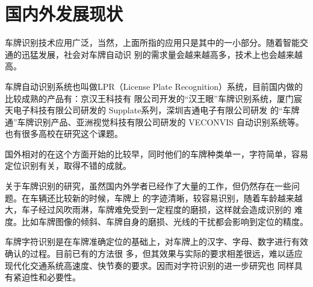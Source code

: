 \section{国内外发展现状}
车牌识别技术应用广泛，当然，上面所指的应用只是其中的一小部分。随着智能交通的迅猛发展，社会对车牌自动识
别的需求量会越来越高多，技术上也会越来越高。
\par
车牌自动识别系统也叫做LPR（License Plate Recognition）系统，目前国内做的比较成熟的产品有：京汉王科技有
限公司开发的“汉王眼”车牌识别系统，厦门宸天电子科技有限公司研发的 Supplate系列，深圳吉通电子有限公司研发
的“车牌通”车牌识别产品、亚洲视觉科技有限公司研发的 VECON­VIS 自动识别系统等。也有很多高校在研究这个课题。

国外相对的在这个方面开始的比较早，同时他们的车牌种类单一，字符简单，容易定位识别有关，取得不错的成就。
\par
关于车牌识别的研究，虽然国内外学者已经作了大量的工作，但仍然存在一些问题。在车辆还比较新的时候，车牌上
的字迹清晰，较容易识别，随着车龄越来越大，车子经过风吹雨淋，车牌难免受到一定程度的磨损，这样就会造成识别的
难度。比如车牌图像的倾斜、车牌自身的磨损、光线的干扰都会影响到定位的精度。
\par
车牌字符识别是在车牌准确定位的基础上，对车牌上的汉字、字母、数字进行有效确认的过程。目前已有的方法很
多，但其效果与实际的要求相差很远，难以适应现代化交通系统高速度、快节奏的要求。因而对字符识别的进一步研究也
同样具有紧迫性和必要性。




